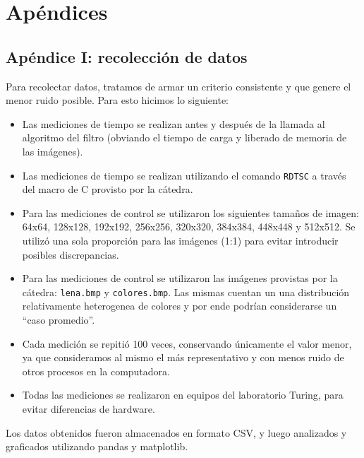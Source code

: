 \section{Apéndices}
 	\subsection{Apéndice I: recolección de datos}

 	Para recolectar datos, tratamos de armar un criterio consistente y que genere el menor ruido posible. Para esto hicimos lo siguiente:

 	\begin{itemize}
 		\item Las mediciones de tiempo se realizan antes y después de la llamada al algoritmo del filtro (obviando el tiempo de carga y liberado de memoria de las imágenes).

 		\item Las mediciones de tiempo se realizan utilizando el comando \texttt{RDTSC} a través del macro de C provisto por la cátedra.

 		\item Para las mediciones de control se utilizaron los siguientes tamaños de imagen: 64x64, 128x128, 192x192, 256x256, 320x320, 384x384, 448x448 y 512x512. Se utilizó una sola proporción para las imágenes (1:1) para evitar introducir posibles discrepancias.

 		\item Para las mediciones de control se utilizaron las imágenes provistas por la cátedra: \texttt{lena.bmp} y \texttt{colores.bmp}. Las mismas cuentan un una distribución relativamente heterogenea de colores y por ende podrían considerarse un “caso promedio”.

 		\item Cada medición se repitió 100 veces, conservando únicamente el valor menor, ya que consideramos al mismo el más representativo y con menos ruido de otros procesos en la computadora.

 		\item Todas las mediciones se realizaron en equipos del laboratorio Turing, para evitar diferencias de hardware.
 	\end{itemize}

 	Los datos obtenidos fueron almacenados en formato CSV, y luego analizados y graficados utilizando pandas y matplotlib.